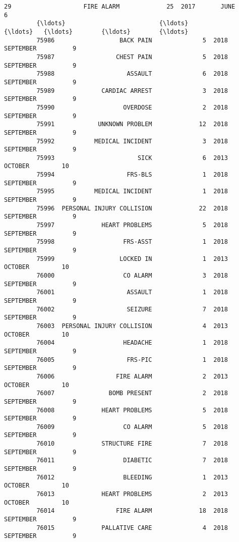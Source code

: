 \documentclass[11pt]{article}
\begin{document}
\begin{Verbatim}[commandchars=\\\{\}]
         29                    FIRE ALARM             25  2017       JUNE          6   
         {\ldots}                          {\ldots}            {\ldots}   {\ldots}        {\ldots}        {\ldots}   
         75986                  BACK PAIN              5  2018  SEPTEMBER          9   
         75987                 CHEST PAIN              5  2018  SEPTEMBER          9   
         75988                    ASSAULT              6  2018  SEPTEMBER          9   
         75989             CARDIAC ARREST              3  2018  SEPTEMBER          9   
         75990                   OVERDOSE              2  2018  SEPTEMBER          9   
         75991            UNKNOWN PROBLEM             12  2018  SEPTEMBER          9   
         75992           MEDICAL INCIDENT              3  2018  SEPTEMBER          9   
         75993                       SICK              6  2013    OCTOBER         10   
         75994                    FRS-BLS              1  2018  SEPTEMBER          9   
         75995           MEDICAL INCIDENT              1  2018  SEPTEMBER          9   
         75996  PERSONAL INJURY COLLISION             22  2018  SEPTEMBER          9   
         75997             HEART PROBLEMS              5  2018  SEPTEMBER          9   
         75998                   FRS-ASST              1  2018  SEPTEMBER          9   
         75999                  LOCKED IN              1  2013    OCTOBER         10   
         76000                   CO ALARM              3  2018  SEPTEMBER          9   
         76001                    ASSAULT              1  2018  SEPTEMBER          9   
         76002                    SEIZURE              7  2018  SEPTEMBER          9   
         76003  PERSONAL INJURY COLLISION              4  2013    OCTOBER         10   
         76004                   HEADACHE              1  2018  SEPTEMBER          9   
         76005                    FRS-PIC              1  2018  SEPTEMBER          9   
         76006                 FIRE ALARM              2  2013    OCTOBER         10   
         76007               BOMB PRESENT              2  2018  SEPTEMBER          9   
         76008             HEART PROBLEMS              5  2018  SEPTEMBER          9   
         76009                   CO ALARM              5  2018  SEPTEMBER          9   
         76010             STRUCTURE FIRE              7  2018  SEPTEMBER          9   
         76011                   DIABETIC              7  2018  SEPTEMBER          9   
         76012                   BLEEDING              1  2013    OCTOBER         10   
         76013             HEART PROBLEMS              2  2013    OCTOBER         10   
         76014                 FIRE ALARM             18  2018  SEPTEMBER          9   
         76015             PALLATIVE CARE              4  2018  SEPTEMBER          9   
         

\end{Verbatim}
\end{document}
